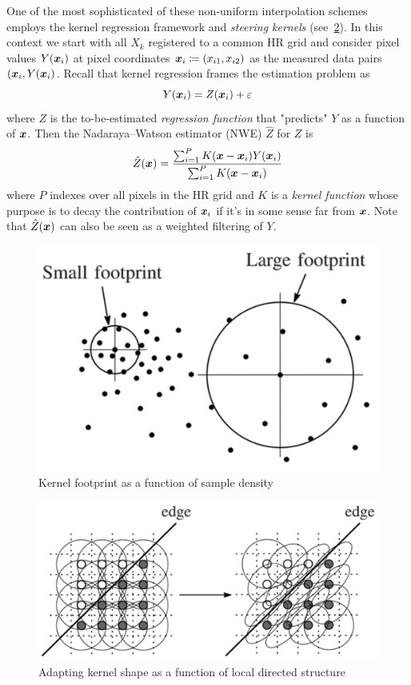 One of the most sophisticated of these non-uniform interpolation schemes employs the kernel regression framework and \textit{steering kernels} (see~\ref{fig:steering}).
%
In this context we start with all $X_k$ registered to a common HR grid and consider pixel values $Y(\bm{x}_i)$ at pixel coordinates $\bm{x}_i \coloneqq (x_{i1},x_{i2})$ as the measured data pairs $(\bm{x}_i, Y(\bm{x}_i)$.
%
Recall that kernel regression frames the estimation problem as
\begin{equation}
    Y(\bm{x}_i) = Z(\bm{x}_i) + \varepsilon
\end{equation}
where $Z$ is the to-be-estimated \textit{regression function} that "predicts" $Y$ as a function of $\bm{x}$.
Then the Nadaraya–Watson estimator (NWE)\cite{Nadaraya} $\hat{Z}$ for $Z$ is
\begin{equation}
    \hat{Z}(\bx) = \frac{\sum_{i=1}^{P}K(\delx)Y(\bxi)}{\sum_{i=1}^{P}K(\delx)}
    \label{eqn:kernelregression}
\end{equation}
where $P$ indexes over all pixels in the HR grid and $K$ is a \textit{kernel function} whose purpose is to decay the contribution of $\bm{x}_i$ if it's in some sense far from $\bm{x}$.
%
Note that $\hat{Z}(\bm{x})$ can also be seen as a weighted filtering of $Y$.
%
\begin{figure}
    \centering
    \includegraphics[width=.8\linewidth]{figures/footprint.png}
    \caption{Kernel footprint as a function of sample density\cite{Takeda2007}}
    \label{fig:footprint}
\end{figure}
\begin{figure}
    \centering
    \includegraphics[width=\linewidth,keepaspectratio]{figures/steering.png}
    \caption{Adapting kernel shape as a function of local directed structure\cite{Takeda2007}}
    \label{fig:steering}
\end{figure}
